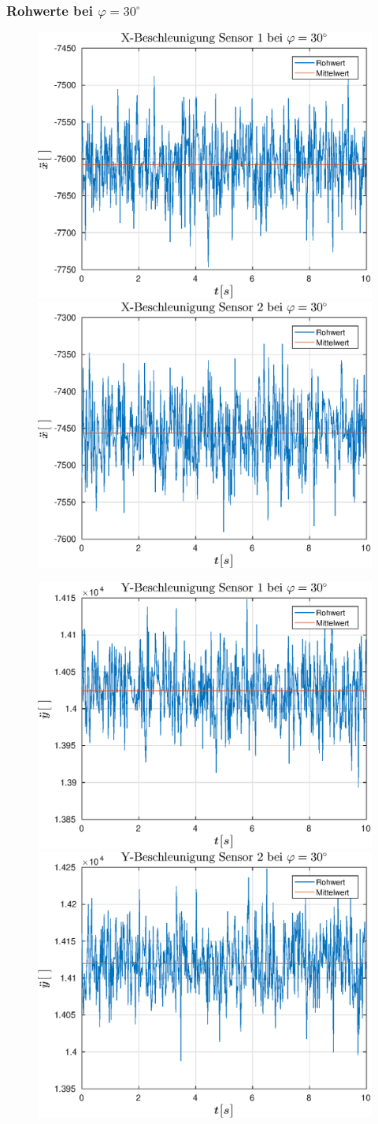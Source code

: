 \newpage
{\subsubsection{Rohwerte bei $\varphi = 30^{\circ}$}
\begin{figure}[h]
	\includegraphics[width=0.5\linewidth]{img/X1__dd___phi_30.eps}
	\includegraphics[width=0.5\linewidth]{img/X2__dd___phi_30.eps}
\end{figure}
\begin{figure}[h]
	\includegraphics[width=0.5\linewidth]{img/Y1__dd___phi_30.eps}
	\includegraphics[width=0.5\linewidth]{img/Y2__dd___phi_30.eps}
\end{figure}}

